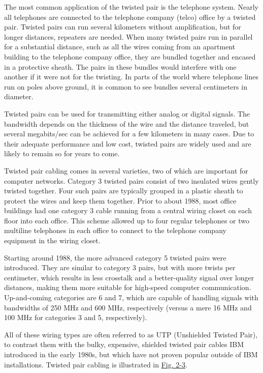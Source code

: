\documentclass[b5paper,11pt]{memoir}
\begin{document}
The most common application of the twisted pair is the telephone system.
Nearly all telephones are connected to the telephone company (telco)
office by a twisted pair. Twisted pairs can run several kilometers
without amplification, but for longer distances, repeaters are needed.
When many twisted pairs run in parallel for a substantial distance, such
as all the wires coming from an apartment building to the telephone
company office, they are bundled together and encased in a protective
sheath. The pairs in these bundles would interfere with one another if
it were not for the twisting. In parts of the world where telephone
lines run on poles above ground, it is common to see bundles several
centimeters in diameter.

Twisted pairs can be used for transmitting either analog or digital
signals. The bandwidth depends on the thickness of the wire and the
distance traveled, but several megabits/sec can be achieved for a few
kilometers in many cases. Due to their adequate performance and low
cost, twisted pairs are widely used and are likely to remain so for
years to come.

Twisted pair cabling comes in several varieties, two of which are
important for computer networks. {Category 3} twisted pairs consist of
two insulated wires gently twisted together. Four such pairs are
typically grouped in a plastic sheath to protect the wires and keep them
together. Prior to about 1988, most office buildings had one category 3
cable running from a central {wiring closet} on each floor into each
office. This scheme allowed up to four regular telephones or two
multiline telephones in each office to connect to the telephone company
equipment in the wiring closet.

Starting around 1988, the more advanced {category 5} twisted pairs were
introduced. They are similar to category 3 pairs, but with more twists
per centimeter, which results in less crosstalk and a better-quality
signal over longer distances, making them more suitable for high-speed
computer communication. Up-and-coming categories are 6 and 7, which are
capable of handling signals with bandwidths of 250 MHz and 600 MHz,
respectively (versus a mere 16 MHz and 100 MHz for categories 3 and 5,
respectively).

All of these wiring types are often referred to as {UTP} ({Unshielded
Twisted Pair}), to contrast them with the bulky, expensive, shielded
twisted pair cables IBM introduced in the early 1980s, but which have
not proven popular outside of IBM installations. Twisted pair cabling is
illustrated in
\protect\hyperlink{0130661023_ch02lev1sec2.htmlux5cux23ch02fig03}{Fig.
2-3}.
\end{document}
